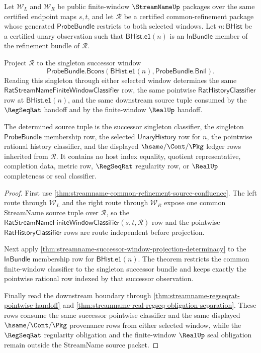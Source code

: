 \begin{theorem}
\label{thm:streamname-common-refinement-successor-projection}
Let $\mathcal W_L$ and $\mathcal W_R$ be public finite-window
$\StreamNameUp$ packages over the same certified endpoint maps $s,t$, and let
$\mathcal R$ be a certified common-refinement package whose generated
$\mathsf{ProbeBundle}$ restricts to both selected windows. Let
$n:\mathsf{BHist}$ be a certified unary observation such that
$\mathsf{BHist.e1}(n)$ is an $\mathsf{InBundle}$ member of the refinement
bundle of $\mathcal R$.

Project $\mathcal R$ to the singleton successor window
$$
\mathsf{ProbeBundle.Bcons}(\mathsf{BHist.e1}(n),\mathsf{ProbeBundle.Bnil}).
$$
Reading this singleton through either selected window determines the same
$\mathsf{RatStreamNameFiniteWindowClassifier}$ row, the same pointwise
$\mathsf{RatHistoryClassifier}$ row at $\mathsf{BHist.e1}(n)$, and the same
downstream source tuple consumed by the $\RegSeqRat$ handoff and by the
finite-window $\RealUp$ handoff.

The determined source tuple is the successor singleton classifier, the
singleton $\mathsf{ProbeBundle}$ membership row, the selected
$\mathsf{UnaryHistory}$ row for $n$, the pointwise rational history classifier,
and the displayed $\hsame/\Cont/\Pkg$ ledger rows inherited from
$\mathcal R$. It contains no host index equality, quotient representative,
completion data, metric row, $\RegSeqRat$ regularity row, or $\RealUp$
completeness or seal classifier.
\end{theorem}
\begin{proof}
First use
\autoref{thm:streamname-common-refinement-source-confluence}. The left route
through $\mathcal W_L$ and the right route through $\mathcal W_R$ expose one
common StreamName source tuple over $\mathcal R$, so the
$\mathsf{RatStreamNameFiniteWindowClassifier}(s,t,\mathcal R)$ row and the
pointwise $\mathsf{RatHistoryClassifier}$ rows are route independent before
projection.

Next apply
\autoref{thm:streamname-successor-window-projection-determinacy} to the
$\mathsf{InBundle}$ membership row for $\mathsf{BHist.e1}(n)$. The theorem
restricts the common finite-window classifier to the singleton successor bundle
and keeps exactly the pointwise rational row indexed by that successor
observation.

Finally read the downstream boundary through
\autoref{thm:streamname-regseqrat-pointwise-handoff} and
\autoref{thm:streamname-real-regseq-obligation-separation}. These rows consume
the same successor pointwise classifier and the same displayed
$\hsame/\Cont/\Pkg$ provenance rows from either selected window, while the
$\RegSeqRat$ regularity obligation and the finite-window $\RealUp$ seal
obligation remain outside the StreamName source packet.
\end{proof}

